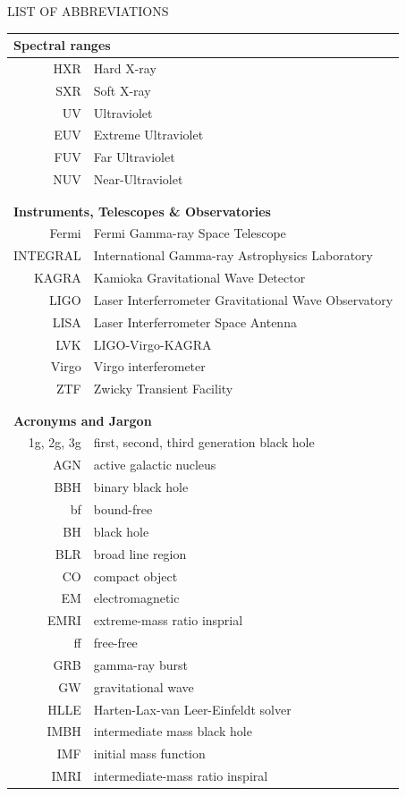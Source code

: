 
\begin{center}
LIST OF ABBREVIATIONS
\end{center}

\begin{tabular}{rl}
\toprule
\multicolumn{2}{l}{\textbf{Spectral ranges}} \\
\midrule
HXR & Hard X-ray \\
SXR & Soft X-ray \\
UV & Ultraviolet \\
EUV & Extreme Ultraviolet \\
FUV & Far Ultraviolet \\
NUV & Near-Ultraviolet \\
\\
\\
\toprule
\multicolumn{2}{l}{\textbf{Instruments, Telescopes \& Observatories}} \\
\midrule
Fermi & Fermi Gamma-ray Space Telescope \\
INTEGRAL & International Gamma-ray Astrophysics Laboratory \\
KAGRA & Kamioka Gravitational Wave Detector \\
LIGO & Laser Interferrometer Gravitational Wave Observatory \\
LISA & Laser Interferrometer Space Antenna \\
LVK & LIGO-Virgo-KAGRA \\
Virgo & Virgo interferometer \\
ZTF & Zwicky Transient Facility \\
\\
\\
\toprule
\multicolumn{2}{l}{\textbf{Acronyms and Jargon}} \\
\midrule
1g, 2g, 3g & first, second, third generation black hole \\
AGN & active galactic nucleus \\
BBH & binary black hole \\
bf & bound-free \\
BH & black hole \\
BLR & broad line region \\
CO & compact object \\
EM & electromagnetic \\
EMRI & extreme-mass ratio insprial \\
ff & free-free \\
GRB & gamma-ray burst \\
GW & gravitational wave \\
HLLE & Harten-Lax-van Leer-Einfeldt solver \\
IMBH & intermediate mass black hole \\
IMF & initial mass function \\
IMRI & intermediate-mass ratio inspiral \\
\end{tabular}



